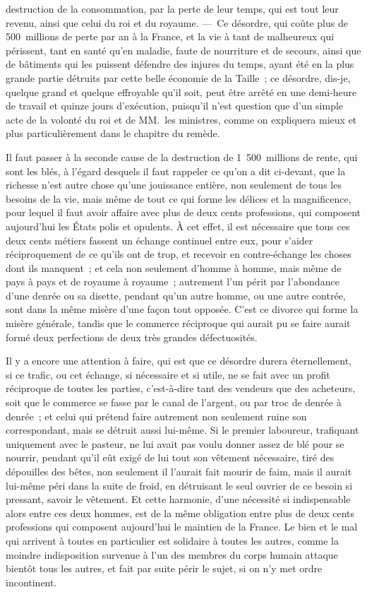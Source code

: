 \documentclass[french,twoside]{book} %
\begin{document}
destruction de la consommation, par la perte de leur temps, qui est tout leur revenu, ainsi que celui du roi et du royaume. — Ce désordre, qui coûte plus de 500 millions de perte par an à la France, et la vie à tant de malheureux qui périssent, tant en santé qu’en maladie, faute de nourriture et de secours, ainsi que de bâtiments qui les puissent défendre des injures du temps, ayant été en la plus grande partie détruits par cette belle économie de la Taille ; ce désordre, dis-je, quelque grand et quelque effroyable qu’il soit, peut être arrêté en une demi-heure de travail et quinze jours d’exécution, puisqu’il n’est question que d’un simple acte de la volonté du roi et de MM. les ministres, comme on expliquera mieux et plus particulièrement dans le chapitre du remède.\par
Il faut passer à la seconde cause de la destruction de 1 500 millions de rente, qui sont les blés, à l’égard desquels il faut rappeler ce qu’on a dit ci-devant, que la richesse n’est autre chose qu’une jouissance entière, non seulement de tous les besoins de la vie, mais même de tout ce qui forme les délices et la magnificence, pour lequel il faut avoir affaire avec plus de deux cents professions, qui composent aujourd’hui les États polis et opulents. À cet effet, il est nécessaire que tous ces deux cents métiers fassent un échange continuel entre eux, pour s’aider réciproquement de ce qu’ils ont de trop, et recevoir en contre-échange les choses dont ils manquent ; et cela non seulement d’homme à homme, mais même de pays à pays et de royaume à royaume ; autrement l’un périt par l’abondance d’une denrée ou sa disette, pendant qu’un autre homme, ou une autre contrée, sont dans la même misère d’une façon tout opposée. C’est ce divorce qui forme la misère générale, tandis que le commerce réciproque qui aurait pu se faire aurait formé deux perfections de deux très grandes défectuosités.\par
Il y a encore une attention à faire, qui est que ce désordre durera éternellement, si ce trafic, ou cet échange, si nécessaire et si utile, ne se fait avec un profit réciproque de toutes les parties, c’est-à-dire tant des vendeurs que des acheteurs, soit que le commerce se fasse par le canal de l’argent, ou par troc de denrée à denrée ; et celui qui prétend faire autrement non seulement ruine son correspondant, mais se détruit aussi lui-même. Si le premier laboureur, trafiquant uniquement avec le pasteur, ne lui avait pas voulu donner assez de blé pour se nourrir, pendant qu’il eût exigé de lui tout son vêtement nécessaire, tiré des dépouilles des bêtes, non seulement il l’aurait fait mourir de faim, mais il aurait lui-même péri dans la suite de froid, en détruisant le seul ouvrier de ce besoin si pressant, savoir le vêtement. Et cette harmonie, d’une nécessité si indispensable alors entre ces deux hommes, est de la même obligation entre plus de deux cents professions qui composent aujourd’hui le maintien de la France. Le bien et le mal qui arrivent à toutes en particulier est solidaire à toutes les autres, comme la moindre indisposition survenue à l’un des membres du corps humain attaque bientôt tous les autres, et fait par suite périr le sujet, si on n’y met ordre incontinent.\par
\end{document}
